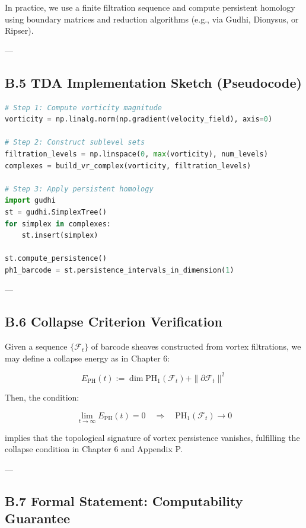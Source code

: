 \documentclass[11pt]{article}
\begin{document}
In practice, we use a finite filtration sequence and compute persistent homology using boundary matrices  
and reduction algorithms (e.g., via Gudhi, Dionysus, or Ripser).

---

\subsection*{B.5 TDA Implementation Sketch (Pseudocode)}

\begin{lstlisting}[language=Python, caption=Vortex Persistence Computation Pipeline (Sketch)]
# Step 1: Compute vorticity magnitude
vorticity = np.linalg.norm(np.gradient(velocity_field), axis=0)

# Step 2: Construct sublevel sets
filtration_levels = np.linspace(0, max(vorticity), num_levels)
complexes = build_vr_complex(vorticity, filtration_levels)

# Step 3: Apply persistent homology
import gudhi
st = gudhi.SimplexTree()
for simplex in complexes:
    st.insert(simplex)

st.compute_persistence()
ph1_barcode = st.persistence_intervals_in_dimension(1)
\end{lstlisting}

---

\subsection*{B.6 Collapse Criterion Verification}

Given a sequence \( \{ \mathcal{F}_t \} \) of barcode sheaves constructed from vortex filtrations,  
we may define a collapse energy as in Chapter 6:

\[
E_{\mathrm{PH}}(t) := \dim \mathrm{PH}_1(\mathcal{F}_t) + \|\partial \mathcal{F}_t\|^2
\]

Then, the condition:

\[
\lim_{t \to \infty} E_{\mathrm{PH}}(t) = 0
\quad \Rightarrow \quad
\mathrm{PH}_1(\mathcal{F}_t) \to 0
\]

implies that the topological signature of vortex persistence vanishes,  
fulfilling the collapse condition in Chapter 6 and Appendix P.

---

\subsection*{B.7 Formal Statement: Computability Guarantee}
\end{document}
